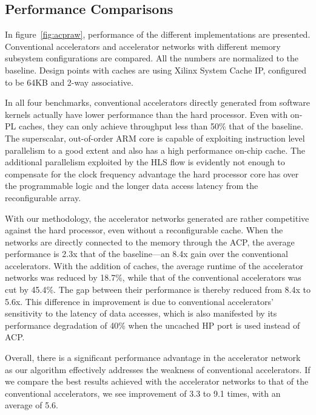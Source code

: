 \documentclass{sig-alternate}
\begin{document}
\subsection{Performance Comparisons}
In figure~\ref{fig:acpraw}, 
performance of the different implementations are presented. 
Conventional accelerators and accelerator networks with different memory subsystem
configurations are compared. All the numbers are normalized to the baseline.
Design points with caches are using Xilinx System Cache IP, configured to be 64KB and 2-way associative.   

In all four benchmarks, conventional accelerators directly generated from software kernels actually have lower performance than the hard processor. Even with
on-PL caches, they can only achieve throughput less than 50\% that of the baseline.
The superscalar, out-of-order ARM core is capable of exploiting instruction level parallelism to a good extent and also has a high performance on-chip cache.
The additional parallelism exploited by the HLS flow is evidently not enough
to compensate for the clock frequency advantage the hard processor core has over the programmable logic and the longer data access latency from the reconfigurable array. 

With our methodology, the accelerator networks generated 
are rather competitive against the hard processor, even
without a reconfigurable cache. When the networks are directly connected to the memory through the ACP, the average performance is 2.3x that of the baseline---an 8.4x gain over the conventional accelerators. 
With the addition of caches,  
the average runtime of the accelerator networks was reduced by 18.7\%,  while that of the conventional accelerators was cut by 45.4\%. The gap between their performance is thereby reduced from 8.4x to 5.6x. This difference in improvement is due to conventional accelerators' sensitivity to the latency of data accesses, which is also manifested by its performance degradation of 40\% when the uncached HP port is used instead of ACP. 

Overall, there is a significant performance advantage in the accelerator network as our algorithm effectively addresses the weakness of conventional accelerators. If we compare the best results achieved with the
accelerator networks to that of the conventional accelerators, we see improvement
of 3.3 to 9.1 times, with an average of 5.6. 
\end{document}
